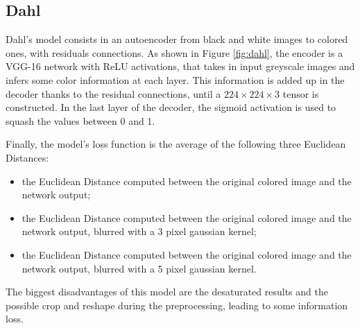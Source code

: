 \subsection{Dahl}

Dahl's model consists in an autoencoder from black and white images to colored ones, with
residuals connections.
As shown in Figure \ref{fig:dahl}, the encoder is a VGG-16 network with ReLU activations, that takes in input greyscale images and infers
some color information at each layer. This information is added up in the decoder thanks to the residual
connections, until a $224 \times 224 \times 3$ tensor is constructed. In the last layer of the decoder, the sigmoid activation is used to squash the values between 0 and 1.

Finally, the model's loss function is the average of the following three Euclidean Distances:
\begin{itemize}
    \item the Euclidean Distance computed between the original colored image and the network output;
    \item the Euclidean Distance computed between the original colored image and the network output, blurred with a 3 pixel gaussian kernel;
    \item the Euclidean Distance computed between the original colored image and the network output, blurred with a 5 pixel gaussian kernel.
\end{itemize}

The biggest disadvantages of this model are the desaturated results and the possible crop and reshape during the preprocessing, leading to some information loss.


